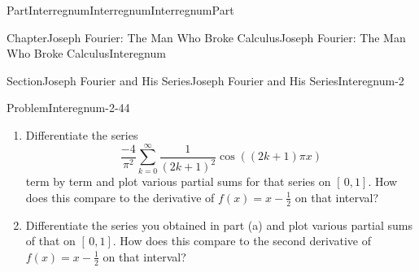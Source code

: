 \documentclass[oneside,10pt,]{book}
\numberwithin{equation}{part}
\begin{document}
\begin{partptx}{Part}{Interregnum}{}{Interregnum}{}{}{InterregnumPart}
\begin{chapterptx}{Chapter}{Joseph Fourier: The Man Who Broke Calculus}{}{Joseph Fourier: The Man Who Broke Calculus}{}{}{Interegnum}
\begin{sectionptx}{Section}{Joseph Fourier and His Series}{}{Joseph Fourier and His Series}{}{}{Interegnum-2}
\begin{problem}{Problem}{}{Interegnum-2-44}
\begin{enumerate}[font=\bfseries,label=(\alph*),ref=\alph*]%
\item{}Differentiate the series%
\begin{equation*}
\frac{-4}{\pi^2}\sum_{k=0}^\infty\frac{1}{\left(2k+1\right)^2}\cos \left((2k+1)\pi x\right)
\end{equation*}
term by term and plot various partial sums for that series on \([\,0,1]\).  How does this compare to the derivative of \(f(x)=x-\frac{1}{2}\) on that interval?%
\item{}Differentiate the series you obtained in part (a) and plot various partial sums of that on \([\,0,1]\).  How does this compare to the second derivative of \(f(x)=x-\frac{1}{2}\) on that interval?%
\end{enumerate}%
\end{problem}
\end{sectionptx}
\end{chapterptx}
\end{partptx}
%
%
\typeout{************************************************}
\typeout{************************************************}
%
\end{document}

